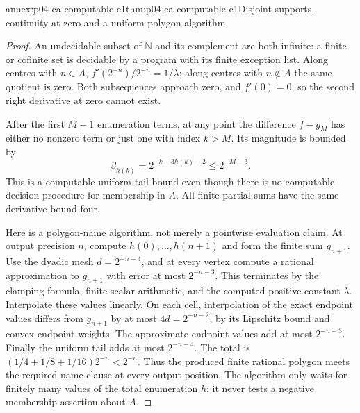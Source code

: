 \begin{annexitem}{annex:p04-ca-computable-c1}{thm:p04-ca-computable-c1}{Disjoint supports, continuity at zero and a uniform polygon algorithm}
\begin{proof}
An undecidable subset of \(\mathbb N\) and its complement are both
infinite: a finite or cofinite set is decidable by a program with its
finite exception list. Along centres with \(n\in A\),
\(f'(2^{-n})/2^{-n}=1/\lambda\); along centres with \(n\notin A\)
the same quotient is zero. Both subsequences approach zero, and
\(f'(0)=0\), so the second right derivative at zero cannot exist.

After the first \(M+1\) enumeration terms, at any point the difference
\(f-g_M\) has either no nonzero term or just one with index \(k>M\).
Its magnitude is bounded by
\[
 \beta_{h(k)}=2^{-k-3h(k)-2}\leq2^{-M-3}.
\]
This is a computable uniform tail bound even though there is no
computable decision procedure for membership in \(A\).
All finite partial sums have the same derivative bound four.

Here is a polygon-name algorithm, not merely a pointwise evaluation
claim. At output precision \(n\), compute \(h(0),\ldots,h(n+1)\)
and form the finite sum \(g_{n+1}\).
Use the dyadic mesh \(d=2^{-n-4}\), and at every vertex compute a
rational approximation to \(g_{n+1}\) with error at most
\(2^{-n-3}\). This terminates by the clamping formula, finite scalar
arithmetic, and the computed positive constant \(\lambda\).
Interpolate these values linearly. On each cell, interpolation of
the exact endpoint values differs from \(g_{n+1}\) by at most
\(4d=2^{-n-2}\), by its Lipschitz bound and convex endpoint weights.
The approximate endpoint values add at most \(2^{-n-3}\).
Finally the uniform tail adds at most \(2^{-n-4}\).
The total is \((1/4+1/8+1/16)2^{-n}<2^{-n}\).
Thus the produced finite rational polygon meets the required name
clause at every output position. The algorithm only waits for finitely
many values of the total enumeration \(h\); it never tests a negative
membership assertion about \(A\).
\end{proof}
\end{annexitem}

